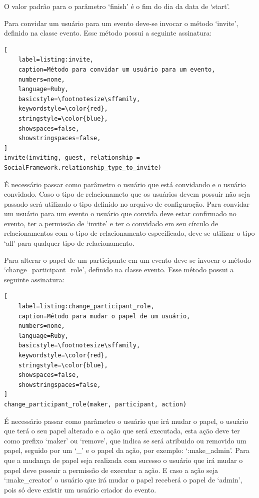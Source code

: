 O valor padrão para o parâmetro `finish' é o fim do dia da data de `start'.

Para convidar um usuário para um evento deve-se invocar o método `invite', definido na classe evento. Esse método possui a seguinte assinatura:

\begin{lstlisting}[
    label=listing:invite,
    caption=Método para convidar um usuário para um evento,
    numbers=none,
    language=Ruby,
    basicstyle=\footnotesize\sffamily,
    keywordstyle=\color{red},
    stringstyle=\color{blue},
    showspaces=false,
    showstringspaces=false,
]
invite(inviting, guest, relationship = SocialFramework.relationship_type_to_invite)
\end{lstlisting}

É necessário passar como parâmetro o usuário que está convidando e o usuário convidado. Caso o tipo de relacionameto que os usuários devem possuir não seja passado será utilizado o tipo definido no arquivo de configuração. Para convidar um usuário para um evento o usuário que convida deve estar confirmado no evento, ter a permissão de `invite' e ter o convidado em seu círculo de relacionamentos com o tipo de relacionamento especificado, deve-se utilizar o tipo `all' para qualquer tipo de relacionamento.

Para alterar o papel de um participante em um evento deve-se invocar o método `change\_participant\_role', definido na classe evento. Esse método possui a seguinte assinatura:

\begin{lstlisting}[
    label=listing:change_participant_role,
    caption=Método para mudar o papel de um usuário,
    numbers=none,
    language=Ruby,
    basicstyle=\footnotesize\sffamily,
    keywordstyle=\color{red},
    stringstyle=\color{blue},
    showspaces=false,
    showstringspaces=false,
]
change_participant_role(maker, participant, action)
\end{lstlisting}

É necessário passar como parâmetro o usuário que irá mudar o papel, o usuário que terá o seu papel alterado e a ação que será executada, esta ação deve ter como prefixo `maker' ou `remove', que indica se será atribuido ou removido um papel, seguido por um `\_' e o papel da ação, por exemplo: `:make\_admin'. Para que a mudança de papel seja realizada com sucesso o usuário que irá mudar o papel deve possuir a permissão de executar a ação. E caso a ação seja `:make\_creator' o usuário que irá mudar o papel receberá o papel de `admin', pois só deve existir um usuário criador do evento.

